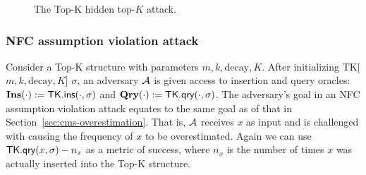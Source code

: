 \begin{figure}[htp]
    \centering
    \begin{pcvstack}
    \end{pcvstack}
	\caption[Redis TK Hidden Top-$K$ Hiding Attack.]{The Top-K hidden top-$K$ attack.}
    \label{fig:tk-hidden-attack} 
\end{figure}


\subsubsection{NFC assumption violation attack}

Consider a Top-K structure with parameters $m, k, \mathrm{decay}, K$. After initializing TK[$m, k, \mathrm{decay}, K$] $\sigma$, an adversary $\mathcal{A}$ is given access to insertion and query oracles: $\textbf{Ins}(\cdot) := \textsf{TK}.\textsf{ins}(\cdot, \sigma)$ and $\textbf{Qry}(\cdot) := \textsf{TK}.\textsf{qry}(\cdot, \sigma)$. The adversary's goal in an NFC assumption violation attack equates to the same goal as of that in Section~\ref{sec:cms-overestimation}. That is, $\mathcal{A}$ receives $x$ as input and is challenged with causing the frequency of $x$ to be overestimated. Again we can use $\textsf{TK}.\textsf{qry}(x, \sigma) - n_x$ as a metric of success, where $n_x$ is the number of times $x$ was actually inserted into the Top-K structure.



